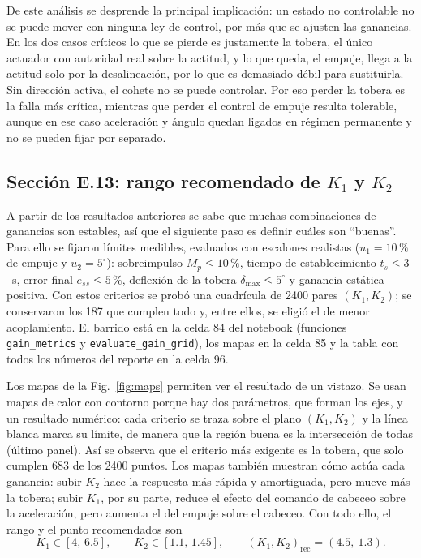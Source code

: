 \documentclass[article, 11pt]{IEEEtran}   %
\begin{document}
De este análisis se desprende la principal implicación: un estado no controlable no se puede mover con ninguna ley de control, por más que se ajusten las ganancias. En los dos casos críticos lo que se pierde es justamente la tobera, el único actuador con autoridad real sobre la actitud, y lo que queda, el empuje, llega a la actitud solo por la desalineación, por lo que es demasiado débil para sustituirla. Sin dirección activa, el cohete no se puede controlar. Por eso perder la tobera es la falla más crítica, mientras que perder el control de empuje resulta tolerable, aunque en ese caso aceleración y ángulo quedan ligados en régimen permanente y no se pueden fijar por separado.

\subsection{Secci\'on E.13: rango recomendado de $K_1$ y $K_2$}

A partir de los resultados anteriores se sabe que muchas combinaciones de ganancias son estables, así que el siguiente paso es definir cuáles son ``buenas''. Para ello se fijaron límites medibles, evaluados con escalones realistas ($u_1=10\,\%$ de empuje y $u_2=5^\circ$): sobreimpulso $M_p\le10\,\%$, tiempo de establecimiento $t_s\le3$~s, error final $e_{ss}\le5\,\%$, deflexión de la tobera $\delta_{\max}\le5^\circ$ y ganancia estática positiva. Con estos criterios se probó una cuadrícula de 2400 pares $(K_1,K_2)$; se conservaron los 187 que cumplen todo y, entre ellos, se eligió el de menor acoplamiento. El barrido está en la celda 84 del notebook (funciones \texttt{gain\_metrics} y \texttt{evaluate\_gain\_grid}), los mapas en la celda 85 y la tabla con todos los números del reporte en la celda 96.

Los mapas de la Fig.~\ref{fig:maps} permiten ver el resultado de un vistazo. Se usan mapas de calor con contorno porque hay dos parámetros, que forman los ejes, y un resultado numérico: cada criterio se traza sobre el plano $(K_1,K_2)$ y la línea blanca marca su límite, de manera que la región buena es la intersección de todas (último panel). Así se observa que el criterio más exigente es la tobera, que solo cumplen 683 de los 2400 puntos. Los mapas también muestran cómo actúa cada ganancia: subir $K_2$ hace la respuesta más rápida y amortiguada, pero mueve más la tobera; subir $K_1$, por su parte, reduce el efecto del comando de cabeceo sobre la aceleración, pero aumenta el del empuje sobre el cabeceo. Con todo ello, el rango y el punto recomendados son
\begin{equation*}
K_1\in[4,\,6.5],\qquad K_2\in[1.1,\,1.45],\qquad (K_1,K_2)_{\text{rec}}=(4.5,\ 1.3).
\end{equation*}
\end{document}
